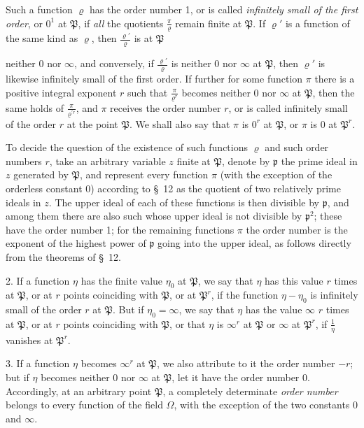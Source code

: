 \documentclass{article}
\begin{document}
Such a function $\varrho$ has the order number 1, or is called \emph{infinitely small of the first order}, or $0^{1}$ at $\mathfrak{P}$, if \emph{all} the quotients $\frac{\pi}{\varrho}$ remain finite at $\mathfrak{P}$. If $\varrho'$ is a function of the same kind as $\varrho$, then $\frac{\varrho'}{\varrho}$ is at $\mathfrak{P}$

neither 0 nor $\infty$, and conversely, if $\frac{\varrho'}{\varrho}$ is neither 0 nor $\infty$ at $\mathfrak{P}$, then $\varrho'$ is likewise infinitely small of the first order. If further for some function $\pi$ there is a positive integral exponent $r$ such that $\frac{\pi}{\varrho^{r}}$ becomes neither 0 nor $\infty$ at $\mathfrak{P}$, then the same holds of $\frac{\pi}{\varrho^{\prime r}}$, and $\pi$ receives the order number $r$, or is called infinitely small of the order $r$ at the point $\mathfrak{P}$. We shall also say that $\pi$ is $0^{r}$ at $\mathfrak{P}$, or $\pi$ is 0 at $\mathfrak{P}^{r}$.

To decide the question of the existence of such functions $\varrho$ and such order numbers $r$, take an arbitrary variable $z$ finite at $\mathfrak{P}$, denote by $\mathfrak{p}$ the prime ideal in $z$ generated by $\mathfrak{P}$, and represent every function $\pi$ (with the exception of the orderless constant 0) according to §~12 as the quotient of two relatively prime ideals in $z$. The upper ideal of each of these functions is then divisible by $\mathfrak{p}$, and among them there are also such whose upper ideal is not divisible by $\mathfrak{p}^{2}$; these have the order number 1; for the remaining functions $\pi$ the order number is the exponent of the highest power of $\mathfrak{p}$ going into the upper ideal, as follows directly from the theorems of §~12.

2. If a function $\eta$ has the finite value $\eta_{0}$ at $\mathfrak{P}$, we say that $\eta$ has this value $r$ times at $\mathfrak{P}$, or at $r$ points coinciding with $\mathfrak{P}$, or at $\mathfrak{P}^{r}$, if the function $\eta - \eta_{0}$ is infinitely small of the order $r$ at $\mathfrak{P}$. But if $\eta_{0} = \infty$, we say that $\eta$ has the value $\infty$ $r$ times at $\mathfrak{P}$, or at $r$ points coinciding with $\mathfrak{P}$, or that $\eta$ is $\infty^{r}$ at $\mathfrak{P}$ or $\infty$ at $\mathfrak{P}^{r}$, if $\frac{1}{\eta}$ vanishes at $\mathfrak{P}^{r}$.

3. If a function $\eta$ becomes $\infty^{r}$ at $\mathfrak{P}$, we also attribute to it the order number $-r$; but if $\eta$ becomes neither 0 nor $\infty$ at $\mathfrak{P}$, let it have the order number 0. Accordingly, at an arbitrary point $\mathfrak{P}$, a completely determinate \emph{order number} belongs to every function of the field $\Omega$, with the exception of the two constants 0 and $\infty$.
\end{document}
